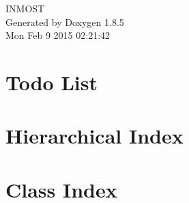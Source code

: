 \documentclass[twoside]{book}
\newcommand{\clearemptydoublepage}{%
  \newpage{\pagestyle{empty}\cleardoublepage}%
}
\begin{document}
\hypersetup{pageanchor=false}
\begin{titlepage}
\vspace*{7cm}
\begin{center}%
{\Large I\-N\-M\-O\-S\-T }\\
\vspace*{1cm}
{\large Generated by Doxygen 1.8.5}\\
\vspace*{0.5cm}
{\small Mon Feb 9 2015 02:21:42}\\
\end{center}
\end{titlepage}
\clearemptydoublepage
\tableofcontents
\clearemptydoublepage
{}
\hypersetup{pageanchor=true}

\chapter{Todo List}
\label{todo}
\hypertarget{todo}{}

\chapter{Hierarchical Index}

\chapter{Class Index}

\end{document}
